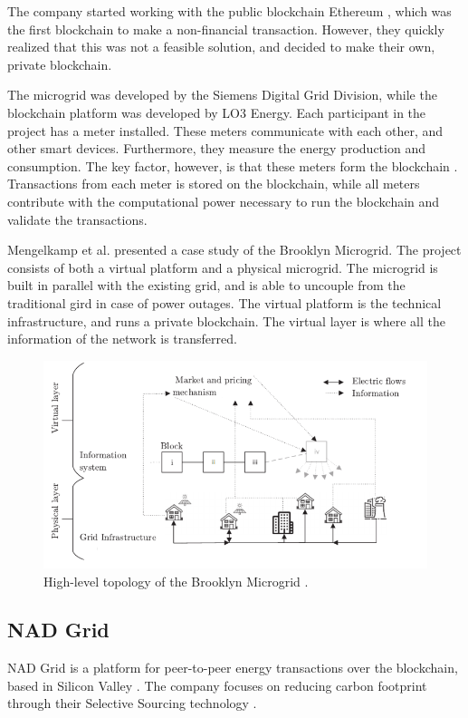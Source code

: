 The company started working with the public blockchain Ethereum \cite{medium_bm, motherboard_bm}, which was the first blockchain to make a non-financial transaction. However, they quickly realized that this was not a feasible solution, and decided to make their own, private blockchain.

The microgrid was developed by the Siemens Digital Grid Division, while the blockchain platform was developed by LO3 Energy. 
Each participant in the project has a meter installed. These meters communicate with each other, and other smart devices. Furthermore, they measure the energy production and consumption. The key factor, however, is that these meters form the blockchain \cite{medium_bm, hbr_grid}. Transactions from each meter is stored on the blockchain, while all meters contribute with the computational power necessary to run the blockchain and validate the transactions. 

Mengelkamp et al. \cite{Brooklyn_Mengelkamp} presented a case study of the Brooklyn Microgrid. The project consists of both a virtual platform and a physical microgrid. The microgrid is built in parallel with the existing grid, and is able to uncouple from the traditional gird in case of power outages. The virtual platform is the technical infrastructure, and runs a private blockchain. The virtual layer is where all the information of the network is transferred. 

\begin{figure}[htb]
    \centering
    \includegraphics[width=1\textwidth]{Images/bm}
    \caption{High-level topology of the Brooklyn Microgrid \cite{Brooklyn_Mengelkamp}.}
    \label{fig:bm}
\end{figure}
 

\subsection{NAD Grid}
NAD Grid is a platform for peer-to-peer energy transactions over the blockchain, based in Silicon Valley \cite{nad_youtube}. The company focuses on reducing carbon footprint through their Selective Sourcing technology \cite{nad}.

